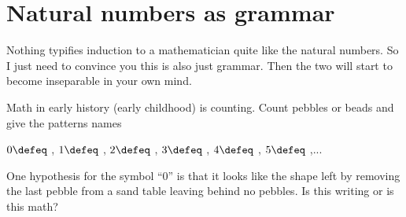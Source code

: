 \chapter{Natural numbers as grammar}
Nothing typifies induction to a mathematician quite like 
the natural numbers.  So I just need to convince you this is 
also just grammar.  Then the two will start to become inseparable 
in your own mind.

Math in early history (early childhood) is counting.  Count 
pebbles or beads and give the patterns names
\begin{center}
    $0\defeq$ \underline{\hspace{5mm}}, 
    $1\defeq$ \StrokeOne,
    $2\defeq$ \StrokeTwo,
    $3\defeq$ \StrokeThree,
    $4\defeq$ \StrokeFour,
    $5\defeq$ \StrokeFive,...
\end{center}
One hypothesis for the symbol
``0'' is that it looks like the shape left by removing the last pebble from
a sand table leaving behind no pebbles.  Is this writing or is this math?

